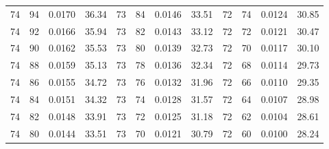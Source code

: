 \begin{tabular}{llll|llll|llll}
74 & 94 & 0.0170 & 36.34 & 73 & 84 & 0.0146 & 33.51 & 72 & 74 & 0.0124 & 30.85\\
74 & 92 & 0.0166 & 35.94 & 73 & 82 & 0.0143 & 33.12 & 72 & 72 & 0.0121 & 30.47\\
74 & 90 & 0.0162 & 35.53 & 73 & 80 & 0.0139 & 32.73 & 72 & 70 & 0.0117 & 30.10\\
74 & 88 & 0.0159 & 35.13 & 73 & 78 & 0.0136 & 32.34 & 72 & 68 & 0.0114 & 29.73\\
74 & 86 & 0.0155 & 34.72 & 73 & 76 & 0.0132 & 31.96 & 72 & 66 & 0.0110 & 29.35\\
74 & 84 & 0.0151 & 34.32 & 73 & 74 & 0.0128 & 31.57 & 72 & 64 & 0.0107 & 28.98\\
74 & 82 & 0.0148 & 33.91 & 73 & 72 & 0.0125 & 31.18 & 72 & 62 & 0.0104 & 28.61\\
74 & 80 & 0.0144 & 33.51 & 73 & 70 & 0.0121 & 30.79 & 72 & 60 & 0.0100 & 28.24\\
\bottomrule
\end{tabular}
\newpage
